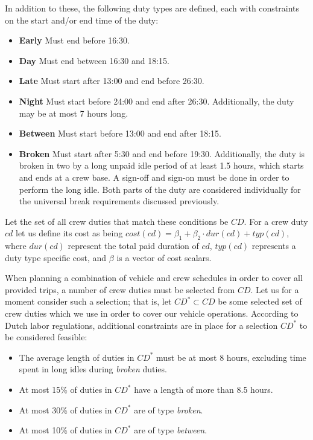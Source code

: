 \documentclass[]{article}
\begin{document}
In addition to these, the following duty types are defined, each with constraints on the start and/or end time of the duty:
\begin{itemize}
  \item \textbf{Early} Must end before 16:30.
  \item \textbf{Day} Must end between 16:30 and 18:15.
  \item \textbf{Late} Must start after 13:00 and end before 26:30.
  \item \textbf{Night} Must start before 24:00 and end after 26:30. Additionally, the duty may be at most 7 hours long.
  \item \textbf{Between} Must start before 13:00 and end after 18:15.
  \item \textbf{Broken} Must start after 5:30 and end before 19:30. Additionally, the duty is broken in two by a long unpaid idle period of at least 1.5 hours, which starts and ends at a crew base. A sign-off and sign-on must be done in order to perform the long idle. Both parts of the duty are considered individually for the universal break requirements discussed previously.
\end{itemize}
Let the set of all crew duties that match these conditions be $CD$. For a crew duty $cd$ let us define its cost as being $cost(cd) = \beta_1 + \beta_2 \cdot dur(cd) + typ(cd)$, where $dur(cd)$ represent the total paid duration of $cd$, $typ(cd)$ represents a duty type specific cost, and $\beta$ is a vector of cost scalars. \newline

\noindent When planning a combination of vehicle and crew schedules in order to cover all provided trips, a number of crew duties must be selected from $CD$. Let us for a moment consider such a selection; that is, let $CD^* \subset CD$ be some selected set of crew duties which we use in order to cover our vehicle operations. According to Dutch labor regulations, additional constraints are in place for a selection $CD^*$ to be considered feasible: 
\begin{itemize}
  \item The average length of duties in $CD^*$ must be at most 8 hours, excluding time spent in long idles during \textit{broken} duties.
  \item At most 15\% of duties in $CD^*$ have a length of more than 8.5 hours.
  \item At most 30\% of duties in $CD^*$ are of type \textit{broken}.
  \item At most 10\% of duties in $CD^*$ are of type \textit{between}.
\end{itemize} 
\end{document}
